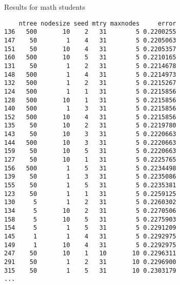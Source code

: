Results for math students
\begin{verbatim}
    ntree nodesize seed mtry maxnodes     error
136   500       10    2   31        5 0.2200255
147    50        1    4   31        5 0.2205063
151    50       10    4   31        5 0.2205357
160   500       10    5   31        5 0.2210165
131    50        1    2   31        5 0.2214678
148   500        1    4   31        5 0.2214973
132   500        1    2   31        5 0.2215267
124   500        1    1   31        5 0.2215856
128   500       10    1   31        5 0.2215856
140   500        1    3   31        5 0.2215856
152   500       10    4   31        5 0.2215856
135    50       10    2   31        5 0.2219780
143    50       10    3   31        5 0.2220663
144   500       10    3   31        5 0.2220663
159    50       10    5   31        5 0.2220663
127    50       10    1   31        5 0.2225765
156   500        1    5   31        5 0.2234498
139    50        1    3   31        5 0.2235086
155    50        1    5   31        5 0.2235381
123    50        1    1   31        5 0.2259125
130     5        1    2   31        5 0.2260302
134     5       10    2   31        5 0.2270506
158     5       10    5   31        5 0.2275903
154     5        1    5   31        5 0.2291209
145     1        1    4   31        5 0.2292975
149     1       10    4   31        5 0.2292975
247    50       10    1   10       10 0.2296311
291    50        1    2   31       10 0.2296900
315    50        1    5   31       10 0.2303179
...
\end{verbatim}

